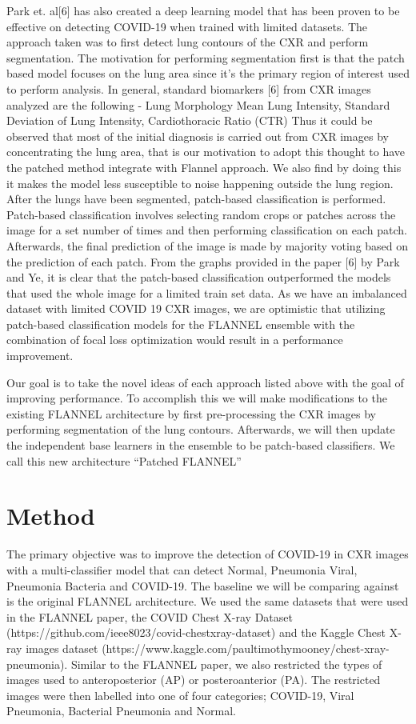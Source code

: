 \documentclass{sigkddExp}
\begin{document}
Park et. al[6] has also created a deep learning model that has been proven to be
effective on detecting COVID-19 when trained with limited datasets. The approach
taken was to first detect lung contours of the CXR and perform segmentation. The
motivation for performing segmentation first is that the patch based model
focuses on the lung area since it’s the primary region of interest used to
perform analysis.  In general, standard biomarkers [6] from CXR images analyzed
are the following - Lung Morphology Mean Lung Intensity, Standard Deviation of
Lung Intensity, Cardiothoracic Ratio (CTR)
Thus it could be observed that most of the initial diagnosis is carried out from
CXR images by concentrating the lung area, that is our motivation to adopt this
thought to have the patched method integrate with Flannel approach. We also find
by doing this it makes the model less susceptible to noise happening outside the
lung region. After the lungs have been segmented, patch-based classification is
performed. Patch-based classification involves selecting random crops or patches
across the image for a set number of times and then performing classification on
each patch. Afterwards, the final prediction of the image is made by majority
voting based on the prediction of each patch. From the graphs provided in the
paper [6] by Park and Ye, it is clear that the patch-based classification
outperformed the models that used the whole image for a limited train set data.
As we have an imbalanced dataset with limited COVID 19 CXR images, we are
optimistic that utilizing patch-based classification models for the FLANNEL
ensemble with the combination of focal loss optimization would result in a
performance improvement.

Our goal is to take the novel ideas of each approach listed above with the goal
of improving performance. To accomplish this we will make modifications to the
existing FLANNEL architecture by first pre-processing the CXR images by
performing segmentation of the lung contours. Afterwards, we will then update
the independent base learners in the ensemble to be patch-based classifiers. We
call this new architecture “Patched FLANNEL”



\section{Method}

The primary objective was to improve the detection of COVID-19 in CXR images
with a multi-classifier model that can detect Normal, Pneumonia Viral, Pneumonia
Bacteria and COVID-19. The baseline we will be comparing against is the original
FLANNEL architecture. We used the same datasets that were used in the FLANNEL
paper, the COVID Chest X-ray Dataset
(https://github.com/ieee8023/covid-chestxray-dataset) and the Kaggle Chest X-ray
images dataset (https://www.kaggle.com/paultimothymooney/chest-xray-pneumonia).
Similar to the FLANNEL paper, we also restricted the types of images used to
anteroposterior (AP) or posteroanterior (PA). The restricted images were then
labelled into one of four categories; COVID-19, Viral Pneumonia, Bacterial
Pneumonia and Normal.
\end{document}

